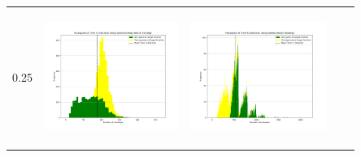 \begin{landscape}
\begin{table}[h!]
\begin{tabular}{ | c | c | c | c | c |}
    0.25 & \vline
    \begin{minipage}[c][45mm][c]{45mm}
      \includegraphics[width=44mm, height=44mm]{Chapters/MultiAgentTargetDetection/Figs/Histograms/VaryingInitBelief/25/25EpsilonGreedyHistogram.png}
    \end{minipage}
    &
    \begin{minipage}[c][45mm][c]{45mm}
      \includegraphics[width=44mm, height=44mm]{Chapters/MultiAgentTargetDetection/Figs/Histograms/VaryingInitBelief/25/25SweepHistogram.png}


\end{minipage}
\end{tabular}
\end{table}
\end{landscape}
